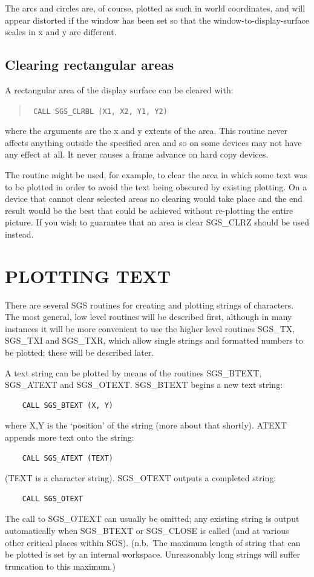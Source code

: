 \documentclass[11pt]{article}
\newcommand{\htmlref}[2]{#1}
\begin{document}
The arcs and circles are, of course, plotted as such in
world coordinates, and will appear
distorted if the window has been set so that the
window-to-display-surface scales in
x and y are different.

\subsection {Clearing rectangular areas}\label{sec-clr-rect}
A rectangular area of the display surface can be cleared with:
\begin{quote}{\tt
    CALL \htmlref{SGS\_CLRBL}{SGS_CLRBL} (X1, X2, Y1, Y2)}
\end{quote}
where the arguments are the x and y extents of the area.  This routine never
affects anything outside the specified area and so on some devices may not
have any effect at all.  It never causes a frame advance on hard copy devices.

The routine might be used, for example, to clear the area in which some text
was to be plotted in order to avoid the text being obscured by existing
plotting.  On a device that cannot clear selected areas no clearing would
take place and the end result would be the best that could be achieved without
re-plotting the entire picture.
If you wish to guarantee that an area is clear
\htmlref{SGS\_CLRZ}{SGS_CLRZ} should be used instead.

\section {PLOTTING TEXT}

There are several SGS routines for creating and plotting
strings of characters.  The most general, low level routines
will be described first, although in many instances it will be
more convenient to use the higher level routines
\htmlref{SGS\_TX}{SGS_TX},
\htmlref{SGS\_TXI}{SGS_TXI} and
\htmlref{SGS\_TXR}{SGS_TXR},
which allow single strings and formatted numbers to be
plotted;  these will be described later.

A text string can be plotted by means of the
routines
\htmlref{SGS\_BTEXT}{SGS_BTEXT},
\htmlref{SGS\_ATEXT}{SGS_ATEXT} and
\htmlref{SGS\_OTEXT}{SGS_OTEXT}.  SGS\_BTEXT begins a new
text string:
\begin{verbatim}
    CALL SGS_BTEXT (X, Y)
\end{verbatim}
where X,Y is the `position' of the string (more about that
shortly).  ATEXT appends more text onto the string:
\begin{verbatim}
    CALL SGS_ATEXT (TEXT)
\end{verbatim}
(TEXT is a character string).  SGS\_OTEXT outputs a completed string:
\begin{verbatim}
    CALL SGS_OTEXT
\end{verbatim}
The call to SGS\_OTEXT can usually be omitted;  any existing string
is output automatically when SGS\_BTEXT or
\htmlref{SGS\_CLOSE}{SGS_CLOSE} is called (and
at various other critical places within SGS).
(n.b.\ The maximum length of string that can be plotted is set by
an internal workspace.  Unreasonably long strings will suffer
truncation to this maximum.)
\end{document}
